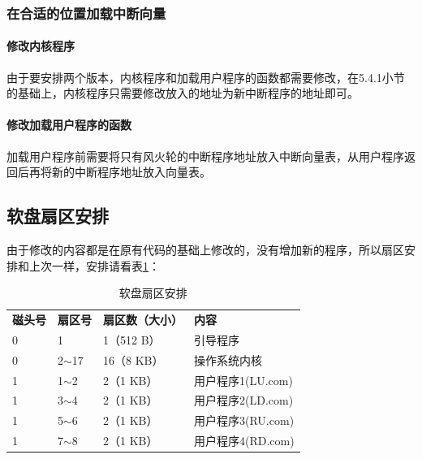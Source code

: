 \documentclass[a4paper, 11pt]{article} %
\begin{document}
\subsubsection{在合适的位置加载中断向量}
\paragraph{修改内核程序}
由于要安排两个版本，内核程序和加载用户程序的函数都需要修改，在5.4.1小节的基础上，内核程序只需要修改放入的地址为新中断程序的地址即可。

\paragraph{修改加载用户程序的函数}
加载用户程序前需要将只有风火轮的中断程序地址放入中断向量表，从用户程序返回后再将新的中断程序地址放入向量表。

\subsection{软盘扇区安排}

由于修改的内容都是在原有代码的基础上修改的，没有增加新的程序，所以扇区安排和上次一样，安排请看表\ref{tab:sectortable}：
\FloatBarrier
\begin{table}[]
\centering
  \caption{软盘扇区安排}
  \label{tab:sectortable}
  \begin{tabular}{llll}
  \rowcolor[HTML]{FFFFFF} 
  {\color[HTML]{333333} \textbf{磁头号}} & {\color[HTML]{333333} \textbf{扇区号}} & {\color[HTML]{333333} \textbf{扇区数（大小）}} & {\color[HTML]{333333} \textbf{内容}} \\
  \rowcolor[HTML]{FFFFFF} 
  {\color[HTML]{333333} 0}            & {\color[HTML]{333333} 1}            & {\color[HTML]{333333} 1（512 B）}         & {\color[HTML]{333333} 引导程序}        \\
  \rowcolor[HTML]{FFFFFF} 
  {\color[HTML]{333333} 0}            & {\color[HTML]{333333} 2$\sim$17}    & {\color[HTML]{333333} 16（8 KB）}         & {\color[HTML]{333333} 操作系统内核}      \\
  \rowcolor[HTML]{F8F8F8} 
  {\color[HTML]{333333} 1}            & {\color[HTML]{333333} 1$\sim$2}     & {\color[HTML]{333333} 2（1 KB）}          & {\color[HTML]{333333} 用户程序1(LU.com)}       \\
  \rowcolor[HTML]{FFFFFF} 
  {\color[HTML]{333333} 1}            & {\color[HTML]{333333} 3$\sim$4}     & {\color[HTML]{333333} 2（1 KB）}          & {\color[HTML]{333333} 用户程序2(LD.com)}       \\
  \rowcolor[HTML]{F8F8F8} 
  {\color[HTML]{333333} 1}            & {\color[HTML]{333333} 5$\sim$6}     & {\color[HTML]{333333} 2（1 KB）}          & {\color[HTML]{333333} 用户程序3(RU.com)}       \\
  \rowcolor[HTML]{FFFFFF} 
  {\color[HTML]{333333} 1}            & {\color[HTML]{333333} 7$\sim$8}     & {\color[HTML]{333333} 2（1 KB）}          & {\color[HTML]{333333} 用户程序4(RD.com)}      
  \end{tabular}
  \end{table}
\end{document}

